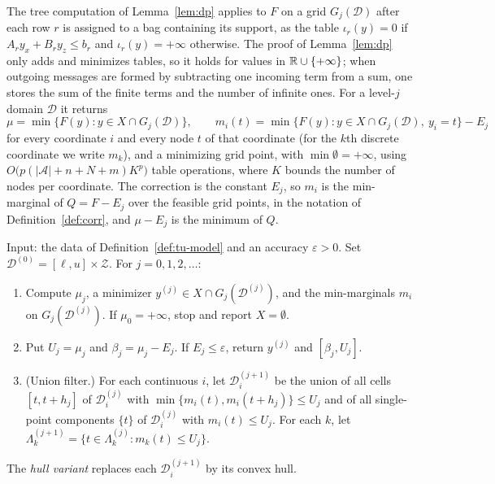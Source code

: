 The tree computation of Lemma~\ref{lem:dp} applies to $F$ on a grid
$G_j(\mathcal D)$ after each row $r$ is assigned to a bag containing its
support, as the table $\iota_r(y)=0$ if $A_ry_x+B_ry_z\le b_r$ and
$\iota_r(y)=+\infty$ otherwise. The proof of Lemma~\ref{lem:dp} only adds and
minimizes tables, so it holds for values in $\mathbb R\cup\{+\infty\}$; when outgoing
messages are formed by subtracting one incoming term from a sum, one stores
the sum of the finite terms and the number of infinite ones. For a level-$j$
domain $\mathcal D$ it returns
\[
\mu=\min\{F(y):y\in X\cap G_j(\mathcal D)\},\qquad
m_i(t)=\min\{F(y):y\in X\cap G_j(\mathcal D),\ y_i=t\}-E_j
\]
for every coordinate $i$ and every node $t$ of that coordinate (for the $k$th
discrete coordinate we write $m_k$), and a minimizing grid point, with $\min\emptyset=+\infty$, using
$O\bigl(p(\lvert\mathcal A\rvert+n+N+m)K^p\bigr)$ table operations, where $K$
bounds the number of nodes per coordinate. The correction is the constant
$E_j$, so $m_i$ is the min-marginal of $Q=F-E_j$ over the feasible grid
points, in the notation of Definition~\ref{def:corr}, and $\mu-E_j$ is the
minimum of $Q$.

\begin{algorithm}\label{alg:tugrid}
Input: the data of Definition~\ref{def:tu-model} and an accuracy
$\varepsilon>0$. Set $\mathcal D^{(0)}=[\ell,u]\times\mathcal Z$. For
$j=0,1,2,\dots$:
\begin{enumerate}[label=(\arabic*)]
\item Compute $\mu_j$, a minimizer $y^{(j)}\in X\cap G_j(\mathcal D^{(j)})$, and
the min-marginals $m_i$ on $G_j(\mathcal D^{(j)})$. If $\mu_0=+\infty$, stop and
report $X=\emptyset$.
\item Put $U_j=\mu_j$ and $\beta_j=\mu_j-E_j$. If $E_j\le\varepsilon$, return
$y^{(j)}$ and $[\beta_j,U_j]$.
\item (Union filter.) For each continuous $i$, let $\mathcal D^{(j+1)}_i$ be
the union of all cells $[t,t+h_j]$ of $\mathcal D^{(j)}_i$ with
$\min\{m_i(t),m_i(t+h_j)\}\le U_j$ and of all single-point components
$\{t\}$ of $\mathcal D^{(j)}_i$ with $m_i(t)\le U_j$. For each $k$, let
$\Lambda^{(j+1)}_k=\{t\in\Lambda^{(j)}_k:m_{k}(t)\le U_j\}$.
\end{enumerate}
The \emph{hull variant} replaces each $\mathcal D^{(j+1)}_i$ by its convex hull.
\end{algorithm}

